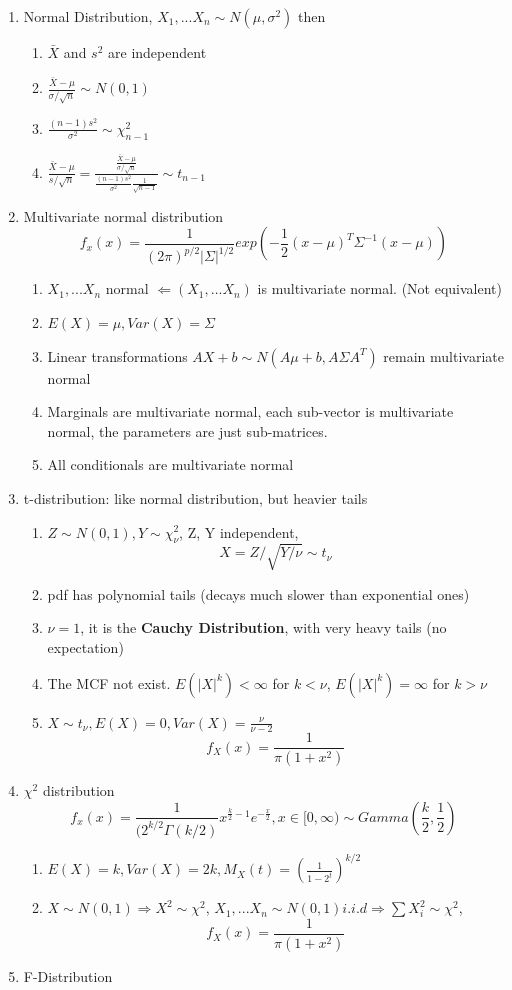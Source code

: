 \documentclass[11pt, openany]{book}              %
\begin{document}
\begin{enumerate}
	\item Normal Distribution, $X_1,...X_n \sim N(\mu,\sigma^2)$ then
	\begin{enumerate}
		\item  $\bar{X}$ and $s^2$ are independent
		\item  $\frac{\bar{X}-\mu}{\sigma/\sqrt{n}} \sim N(0,1)$
		\item  $\frac{(n-1)s^2}{\sigma^2} \sim \chi_{n-1}^2$
		\item  $\frac{\bar{X}-\mu }{s/\sqrt{n}} = \frac{\frac{\bar{X}-\mu}{\sigma/\sqrt{n}}}{\frac{(n-1)s^2}{\sigma^2} \frac{1}{\sqrt{n-1}}} \sim t_{n-1}$
	\end{enumerate}
	\item Multivariate normal distribution
	$$ f_x(x) = \frac{1}{(2\pi)^{p/2}|\Sigma|^{1/2}}exp(-\frac{1}{2}(x-\mu)^T\Sigma^{-1}(x-\mu))$$
	\begin{enumerate}
		\item $X_1,...X_n$ normal $\Leftarrow (X_1,...X_n)$ is multivariate normal. (Not equivalent)
		\item $E(X)=\mu, Var(X) = \Sigma$
		\item Linear transformations $AX+b \sim N(A\mu+b, A\Sigma A^T)$ remain multivariate normal
		\item Marginals are multivariate normal, each sub-vector is multivariate normal, the parameters are just sub-matrices.
		\item All conditionals are multivariate normal 
	\end{enumerate}
	\item t-distribution: like normal distribution, but heavier tails
	\begin{enumerate}
		\item $Z \sim N(0,1), Y \sim \chi^2_{\nu}$, Z, Y independent, $$ X= Z/\sqrt{Y/\nu} \sim t_{\nu} $$
		\item pdf has polynomial tails (decays much slower than exponential ones)
		\item $\nu=1$, it is the \textbf{Cauchy Distribution}, with very heavy tails (no expectation)
		\item The MCF not exist. $E(|X|^k) < \infty$ for $k<\nu$, $E(|X|^k) = \infty$ for $k>\nu$
		\item $X\sim t_\nu, E(X)=0, Var(X)=\frac{\nu}{\nu-2}$
		$$ f_X(x)=\frac{1}{\pi(1+x^2)}$$
	\end{enumerate}
	\item $\chi^2$ distribution
	$$ f_x(x) = \frac{1}{(2^{k/2}\Gamma(k/2)}x^{\frac{k}{2}-1}e^{-\frac{x}{2}}, x\in [0,\infty) \sim Gamma(\frac{k}{2},\frac{1}{2})$$
	\begin{enumerate}
		\item $E(X)=k, Var(X)=2k, M_X(t)= (\frac{1}{1-2^t})^{k/2}$
		\item $X \sim N(0,1) \Rightarrow X^2 \sim \chi^2$, $X_1,...X_n \sim N(0,1) i.i.d \Rightarrow \sum X_i^2 \sim \chi^2$,
		$$ f_X(x)=\frac{1}{\pi(1+x^2)}$$
	\end{enumerate}	
	\item F-Distribution 
\end{enumerate}
\end{document}
